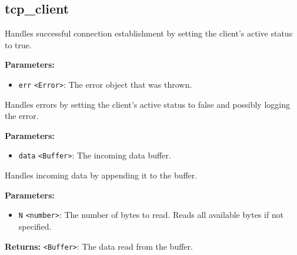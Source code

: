 \documentclass[12pt,a4paper]{article}
\begin{document}
\subsection{tcp\_client}
\vspace{5mm}
\noindent {}


\noindent Handles successful connection establishment by setting the client's active status to true.

\vspace{5mm}
\noindent {}


\noindent \textbf{Parameters:}
\begin{itemize}
  \item \texttt{err} \texttt{<Error>}: The error object that was thrown.
\end{itemize}

\noindent Handles errors by setting the client's active status to false and possibly logging the error.

\vspace{5mm}
\noindent {}


\noindent \textbf{Parameters:}
\begin{itemize}
  \item \texttt{data} \texttt{<Buffer>}: The incoming data buffer.
\end{itemize}

\noindent Handles incoming data by appending it to the buffer.

\vspace{5mm}
\noindent {}


\noindent \textbf{Parameters:}
\begin{itemize}
  \item \texttt{N} \texttt{<number>}: The number of bytes to read. Reads all available bytes if not specified.
\end{itemize}

\noindent \textbf{Returns:} \texttt{<Buffer>}: The data read from the buffer.
\end{document}
